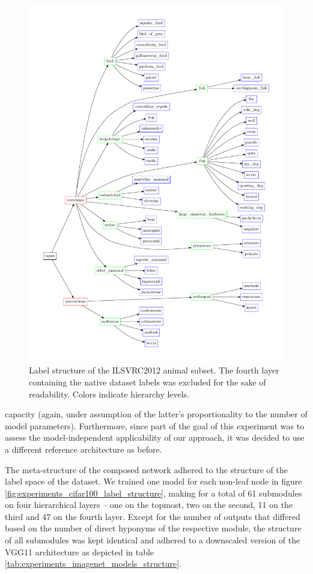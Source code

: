 \begin{figure}[htb]
    \centering
	    \includegraphics[width=\textwidth]{thesis/graphics/diagrams/ilsvrc2012_as_label_structure.pdf}
    \caption{Label structure of the ILSVRC2012 animal subset. The fourth layer containing the native dataset labels was excluded for the sake of readability. Colors indicate hierarchy levels.}
    \label{fig:experiments_imagenet_label_structure}
\end{figure}

\clearpage

capacity (again, under assumption of the latter's proportionality to the number of model parameters). Furthermore, since part of the goal of this experiment was to assess the model-independent applicability of our approach, it was decided to use a different reference architecture as before.

The meta-structure of the composed network adhered to the structure of the label space of the dataset. We trained one model for each non-leaf node in figure \ref{fig:experiments_cifar100_label_structure}, making for a total of 61 submodules on four hierarchical layers -- one on the topmost, two on the second, 11 on the third and 47 on the fourth layer. Except for the number of outputs that differed based on the number of direct hyponyms of the respective module, the structure of all submodules was kept identical and adhered to a downscaled version of the VGG11 architecture as depicted in table \ref{tab:experiments_imagenet_models_structure}.

